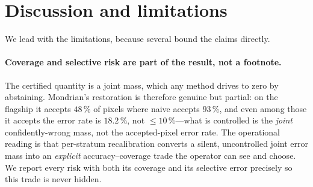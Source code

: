\documentclass[preprint,3p,times]{elsarticle}
\begin{document}
\section{Discussion and limitations}
\label{sec:disc}
We lead with the limitations, because several bound the claims directly.

\paragraph{Coverage and selective risk are part of the result, not a footnote.} The certified quantity is a joint mass, which any method drives to zero by abstaining. Mondrian's restoration is therefore genuine but partial: on the flagship it accepts $48\,\%$ of pixels where naive accepts $93\,\%$, and even among those it accepts the error rate is $18.2\,\%$, not $\leq\!10\,\%$---what is controlled is the \emph{joint} confidently-wrong mass, not the accepted-pixel error rate. The operational reading is that per-stratum recalibration converts a silent, uncontrolled joint error mass into an \emph{explicit} accuracy--coverage trade the operator can see and choose. We report every risk with both its coverage and its selective error precisely so this trade is never hidden.
\end{document}
